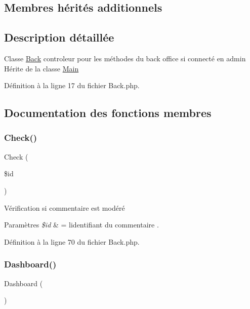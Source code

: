 \subsection*{Membres hérités additionnels}


\subsection{Description détaillée}
Classe \hyperlink{class_src_1_1_controllers_1_1_back}{Back} controleur pour les méthodes du back office si connecté en admin Hérite de la classe \hyperlink{class_src_1_1_controllers_1_1_main}{Main} 

Définition à la ligne 17 du fichier Back.\+php.



\subsection{Documentation des fonctions membres}
\mbox{\label{class_src_1_1_controllers_1_1_back_a384a1ec9e22b88a73de48023bb2bbf4f}} 
\subsubsection{\texorpdfstring{Check()}{Check()}}
{\footnotesize\ttfamily Check (\begin{DoxyParamCaption}\item[{}]{\$id }\end{DoxyParamCaption})}

Vérification si commentaire est modéré 
\begin{DoxyParams}{Paramètres}
{\em \$id} & = l\textquotesingle{}identifiant du commentaire . \\
\hline
\end{DoxyParams}


Définition à la ligne 70 du fichier Back.\+php.

\mbox{\label{class_src_1_1_controllers_1_1_back_a405a66825259e2e811a2011a61c2beff}} 
\subsubsection{\texorpdfstring{Dashboard()}{Dashboard()}}
{\footnotesize\ttfamily Dashboard (\begin{DoxyParamCaption}{ }\end{DoxyParamCaption})}

